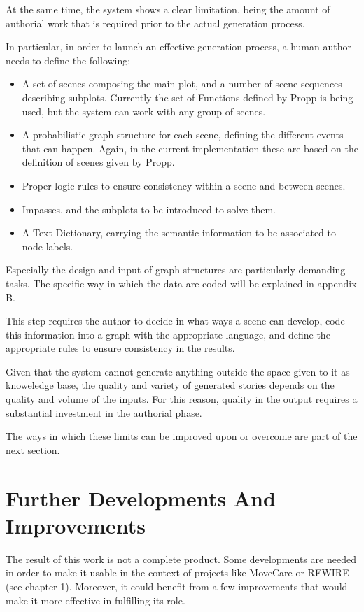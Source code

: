 \documentclass[12pt,a4paper,oneside]{report}
\begin{document}
At the same time, the system shows a clear limitation, being the amount of authorial work that is required prior to the actual generation process.

In particular, in order to launch an effective generation process, a human author needs to define the following:
\begin{itemize}\setlength{\itemsep}{0pt}
\item A set of scenes composing the main plot, and a number of scene sequences describing subplots. Currently the set of Functions defined by Propp is being used, but the system can work with any group of scenes.
\item A probabilistic graph structure for each scene, defining the different events that can happen. Again, in the current implementation these are based on the definition of scenes given by Propp.
\item Proper logic rules to ensure consistency within a scene and between scenes.
\item Impasses, and the subplots to be introduced to solve them.
\item A Text Dictionary, carrying the semantic information to be associated to node labels.
\end{itemize}

Especially the design and input of graph structures are particularly demanding tasks. The specific way in which the data are coded will be explained in appendix B.

This step requires the author to decide in what ways a scene can develop, code this information into a graph with the appropriate language, and define the appropriate rules to ensure consistency in the results.

Given that the system cannot generate anything outside the space given to it as knoweledge base, the quality and variety of generated stories depends on the quality and volume of the inputs. For this reason, quality in the output requires a substantial investment in the authorial phase.

\bigskip

The ways in which these limits can be improved upon or overcome are part of the next section.

\pagebreak

\section{Further Developments And Improvements}

The result of this work is not a complete product. Some developments are needed in order to make it usable in the context of projects like MoveCare or REWIRE (see chapter 1). Moreover, it could benefit from a few improvements that would make it more effective in fulfilling its role.
\end{document}
